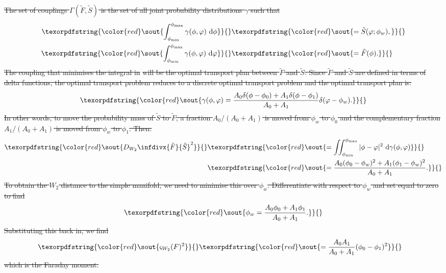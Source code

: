 \documentclass[11pt, a4paper]{book}
\providecommand{\DIFdeltex}[1]{{\protect\color{red}\sout{#1}}}                      %
\providecommand{\DIFdel}[1]{\texorpdfstring{\DIFdeltex{#1}}{}} %
\begin{document}
\DIFdel{The set of couplings $\Gamma(\tilde F, \tilde S)$ is the set of all joint probability distributions $\gamma$ such that
    }\begin{align*}
      \DIFdel{\int_{\phi_{\min}}^{\phi_{\max}} \gamma(\phi, \varphi)\ \mathrm{d}\phi }&\DIFdel{= \tilde S(\varphi; \phi_w),}\\
      \DIFdel{\int_{\phi_{\min}}^{\phi_{\max}} \gamma(\phi, \varphi)\ \mathrm{d}\varphi }&\DIFdel{= \tilde F(\phi).
    }\end{align*}%
\DIFdel{The coupling that minimises the integral in }%
\DIFdel{will be the optimal transport plan between $\tilde F$ and $\tilde S$. Since $\tilde F$ and $\tilde S$ are defined in terms of delta functions, the optimal transport problem reduces to a discrete optimal transport problem and the optimal transport plan is:
    }\begin{displaymath}
      \DIFdel{\gamma(\phi, \varphi) = \frac{A_0 \delta(\phi - \phi_0) + A_1 \delta(\phi - \phi_1)}{A_0 + A_1} \delta(\varphi - \phi_w).
    }\end{displaymath}%
\DIFdel{In other words, to move the probability mass of $\tilde S$ to $\tilde F$, a fraction $A_0/(A_0 + A_1)$ is moved from $\phi_w$ to $\phi_0$ and the complementary fraction $A_1/(A_0 + A_1)$ is moved from $\phi_w$ to $\phi_1$. Then:
    }\begin{align*}
      \DIFdel{D_{W_2}\infdivx{\tilde F}{\tilde S}^2 }&\DIFdel{= \iint_{\phi_{\min}}^{\phi_{\max}} |\phi - \varphi|^2\ \mathrm{d}\gamma(\phi, \varphi)}\\
        &\DIFdel{= \frac{A_0 (\phi_0 - \phi_w)^2 + A_1 (\phi_1 - \phi_w)^2}{A_0 + A_1}.
    }\end{align*}%
\DIFdel{To obtain the $W_2$ distance to the simple manifold, we need to minimise this over $\phi_w$. Differentiate with respect to $\phi_w$ and set equal to zero to find
    }\begin{displaymath}
      \DIFdel{\phi_w = \frac{A_0 \phi_0 + A_1 \phi_1}{A_0 + A_1}.
    }\end{displaymath}%
\DIFdel{Substituting this back in, we find
    }\begin{align*}
      \DIFdel{\varsigma_{W_2}(F)^2 }&\DIFdel{= \frac{A_0 A_1}{A_0 + A_1}(\phi_0 - \phi_1)^2
    }\end{align*}%
\DIFdel{which is the Faraday moment.
}%
\end{document}
